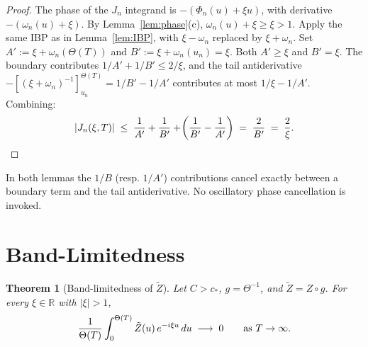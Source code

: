 \documentclass{amsart}
\newcommand{\assign}{:=}
\newtheorem{theorem}{Theorem}
\newcommand{\abs}[1]{\left| #1 \right|}
\newcommand{\Zt}{\tilde{Z}}
\begin{document}
\begin{proof}
  The phase of the $J_n$ integrand is $- (\Phi_n (u) + \xi u)$, with
  derivative $- (\omega_n (u) + \xi)$. By Lemma~\ref{lem:phase}(c), $\omega_n
  (u) + \xi \ge \xi > 1$. Apply the same IBP as in Lemma~\ref{lem:IBP}, with
  $\xi - \omega_n$ replaced by $\xi + \omega_n$. Set $A' \assign \xi +
  \omega_n (\Theta (T))$ and $B' \assign \xi + \omega_n (u_n) = \xi$. Both $A'
  \ge \xi$ and $B' = \xi$. The boundary contributes $1 / A' + 1 / B' \le 2 /
  \xi$, and the tail antiderivative $- [(\xi + \omega_n)^{- 1}]_{u_n}^{\Theta
  (T)} = 1 / B' - 1 / A'$ contributes at most $1 / \xi - 1 / A'$. Combining:
  \[ \abs{J_n (\xi, T)} \hspace{0.27em} \le \hspace{0.27em} \frac{1}{A'} +
     \frac{1}{B'} + \hspace{-0.17em} \left( \frac{1}{B'} - \frac{1}{A'}
     \right) \hspace{0.27em} = \hspace{0.27em} \frac{2}{B'} \hspace{0.27em} =
     \hspace{0.27em} \frac{2}{\xi} . \]
\end{proof}

\begin{remark}
  In both lemmas the $1 / B$ (resp. $1 / A'$) contributions cancel exactly
  between a boundary term and the tail antiderivative. No oscillatory phase
  cancellation is invoked.
\end{remark}

\section{Band-Limitedness}

\begin{theorem}
  [Band-limitedness of $\Zt$]\label{thm:band} Let $C > c_{\ast}$, $g =
  \Theta^{- 1}$, and $\Zt = Z \circ g$. For every $\xi \in \mathbb{R}$ with
  $\abs{\xi} > 1$,
  \[ \frac{1}{\Theta (T)}  \int_0^{\Theta (T)} \Zt (u)  \hspace{0.17em} e^{- i
     \xi u}  \hspace{0.17em} du \hspace{0.27em} \longrightarrow
     \hspace{0.27em} 0 \qquad \text{as } T \to \infty . \]
\end{theorem}
\end{document}
